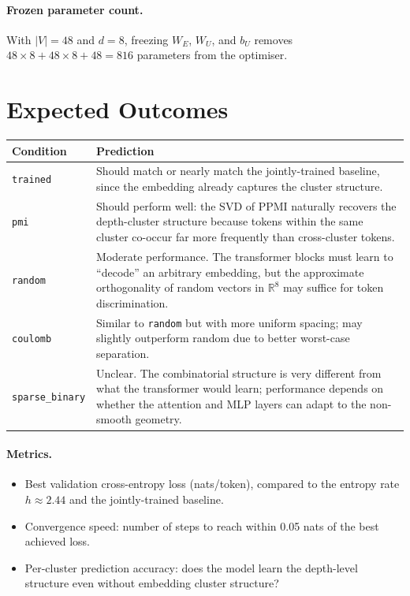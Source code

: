 \documentclass[11pt]{article}
\begin{document}
\paragraph{Frozen parameter count.}
With $|V| = 48$ and $d = 8$, freezing $W_E$, $W_U$, and $b_U$ removes
$48 \times 8 + 48 \times 8 + 48 = 816$ parameters from the optimiser.

\section{Expected Outcomes}

\begin{center}
\begin{tabular}{lp{9cm}}
  \toprule
  Condition & Prediction \\
  \midrule
  \texttt{trained}
    & Should match or nearly match the jointly-trained baseline, since
      the embedding already captures the cluster structure. \\
  \texttt{pmi}
    & Should perform well: the SVD of PPMI naturally recovers the
      depth-cluster structure because tokens within the same cluster
      co-occur far more frequently than cross-cluster tokens. \\
  \texttt{random}
    & Moderate performance.  The transformer blocks must learn to
      ``decode'' an arbitrary embedding, but the approximate
      orthogonality of random vectors in $\mathbb{R}^8$ may suffice for
      token discrimination. \\
  \texttt{coulomb}
    & Similar to \texttt{random} but with more uniform spacing; may
      slightly outperform random due to better worst-case separation. \\
  \texttt{sparse\_binary}
    & Unclear.  The combinatorial structure is very different from what
      the transformer would learn; performance depends on whether the
      attention and MLP layers can adapt to the non-smooth geometry. \\
  \bottomrule
\end{tabular}
\end{center}

\paragraph{Metrics.}
\begin{itemize}
  \item Best validation cross-entropy loss (nats/token), compared to the
        entropy rate $h \approx 2.44$ and the jointly-trained baseline.
  \item Convergence speed: number of steps to reach within 0.05 nats of
        the best achieved loss.
  \item Per-cluster prediction accuracy: does the model learn the
        depth-level structure even without embedding cluster structure?
\end{itemize}
\end{document}
